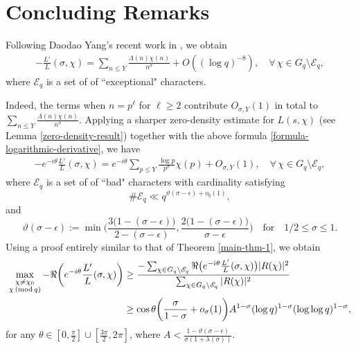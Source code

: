 \documentclass[12pt]{amsart}
\numberwithin{equation}{section}
\theoremstyle{plain}
\theoremstyle{remark}
\theoremstyle{definition}
\theoremstyle{remark}
\renewcommand{\mod}[1]{\,({\rm mod}\,#1)}
\begin{document}
\section{Concluding Remarks}
Following Daodao Yang's recent work in \cite[(32)]{Yangdaodao2023}, we obtain
\begin{equation}\label{formula-logarithmic-derivative}
\begin{aligned}
-\frac{L'}{L}(\sigma,\chi)=\sum_{n\leq Y}\frac{\Lambda(n)\chi(n)}{n^{\sigma}}+O((\log q)^{-8}),\quad\forall\,\chi\in G_q\setminus \mathscr{E}_q,
\end{aligned}
\end{equation}
where $\mathscr{E}_q$ is a set of of ``exceptional" characters.

Indeed, the terms when $n=p^{\ell}$ for $\ell\geq2$ contribute $O_{\sigma,Y}(1)$ in total
to $\sum_{n\leq Y}\frac{\Lambda(n)\chi(n)}{n^{\sigma}}$. Applying a sharper zero-density estimate for $L(s,\chi)$ (see Lemma \ref{zero-density-result}) together with the above formula \eqref{formula-logarithmic-derivative}, we have
\begin{equation}\label{formula-logarithmic-derivative}
\begin{aligned}
-e^{-i\theta}\frac{L'}{L}(\sigma,\chi)=e^{-i\theta}\sum_{p\leq Y}\frac{\log p}{p^{\sigma}}\chi(p)+O_{\sigma,Y}(1),\quad\forall\,\chi\in G_q\setminus \mathscr{E}_q,
\end{aligned}
\end{equation}
where $\mathscr{E}_{q}$ is a set of of ``bad" characters with cardinality satisfying
\[
\#\mathscr{E}_{q}\ll q^{\vartheta(\sigma-\epsilon)+o_q(1)},
\]
and
\[
\vartheta(\sigma-\epsilon):=\min\bigg(\frac{3\big(1-(\sigma-\epsilon)\big)}{2-(\sigma-\epsilon)},\frac{2\big(1-(\sigma-\epsilon)\big)}{\sigma-\epsilon}\bigg)
\quad\text{for}\quad 1/2\leq\sigma\leq1.
\]
Using a proof entirely similar to that of Theorem \ref{main-thm-1}, we obtain
\begin{equation*}
\begin{aligned}
\max_{\substack{\chi\neq\chi_0\\ \chi\mod q}}-\Re\bigg(e^{-i\theta}\frac{L'}{L}(\sigma,\chi)\bigg)
&\geq
\frac
{
-\sum_{\chi\in G_q\setminus \mathscr{E}_q}\Re\big(e^{-i\theta}\frac{L'}{L}(\sigma,\chi)\big)|R(\chi)|^2
}
{
\sum_{\chi\in G_q\setminus \mathscr{E}_q}|R(\chi)|^2
}\\
&\geq\cos\theta\bigg(\frac{\sigma}{1-\sigma}+o_{\sigma}(1)\bigg)
A^{1-\sigma}(\log q)^{1-\sigma}(\log\log q)^{1-\sigma},
\end{aligned}
\end{equation*}
for any $\theta\in[0,\frac{\pi}{2}]\cup[\frac{3\pi}{2},2\pi]$, where $A<\frac{1-\vartheta(\sigma-\epsilon)}{\sigma(1+\lambda(\sigma))}$.
\end{document}
